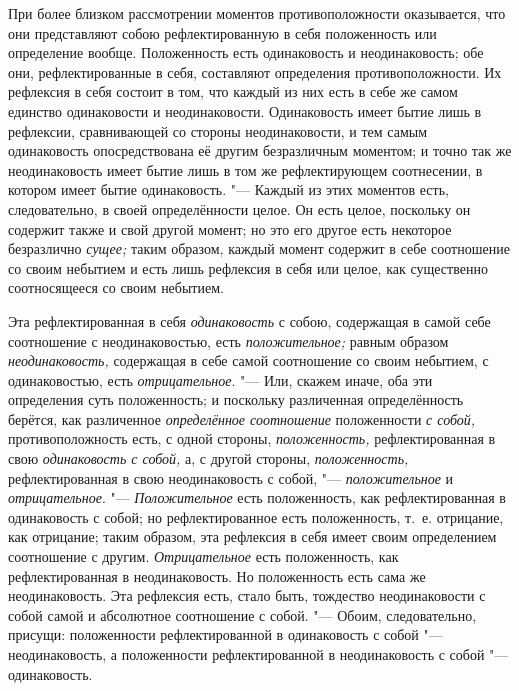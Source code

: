 При более близком рассмотрении моментов противоположности оказывается, что
они представляют собою рефлектированную в себя положенность или определение
вообще. Положенность есть одинаковость и неодинаковость; обе они,
рефлектированные в себя, составляют определения противоположности. Их
рефлексия в себя состоит в том, что каждый из них есть в себе же самом
единство одинаковости и неодинаковости. Одинаковость имеет бытие лишь в
рефлексии, сравнивающей со стороны неодинаковости, и тем самым одинаковость
опосредствована её другим безразличным моментом; и точно так же
неодинаковость имеет бытие лишь в том же рефлектирующем соотнесении, в
котором имеет бытие одинаковость. "--- Каждый из этих моментов есть,
следовательно, в своей определённости целое. Он есть целое, поскольку он
содержит также и свой другой момент; но это его другое есть некоторое
безразлично {\em сущее;} таким образом, каждый момент
содержит в себе соотношение со своим небытием и есть лишь рефлексия в себя
или целое, как существенно соотносящееся со своим небытием.

Эта рефлектированная в себя {\em одинаковость} с собою,
содержащая в самой себе соотношение с неодинаковостью, есть
{\em положительное;} равным образом
{\em неодинаковость,} содержащая в себе самой
соотношение со своим небытием, с одинаковостью, есть
{\em отрицательное}. "--- Или, скажем иначе, оба эти
определения суть положенность; и поскольку различенная определённость
берётся, как различенное {\em определённое соотношение}
положенности {\em с собой,} противоположность есть, с
одной стороны, {\em положенность,} рефлектированная в
свою {\em одинаковость с собой,} а, с другой стороны,
{\em положенность,} рефлектированная в свою
неодинаковость с собой, "--- {\em положительное} и
{\em отрицательное}. "--- {\em Положительное} есть положенность, как
рефлектированная в одинаковость с собой; но рефлектированное есть
положенность, т.~е. отрицание, как отрицание; таким образом, эта рефлексия
в себя имеет своим определением соотношение с другим.
{\em Отрицательное} есть положенность, как
рефлектированная в неодинаковость. Но положенность есть сама же
неодинаковость. Эта рефлексия есть, стало быть, тождество неодинаковости с
собой самой и абсолютное соотношение с собой. "--- Обоим, следовательно,
присущи: положенности рефлектированной в одинаковость с собой
"--- неодинаковость, а положенности рефлектированной в неодинаковость с собой
"--- одинаковость.

